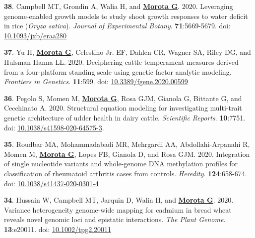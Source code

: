 \documentclass[margin,line,10pt]{res}
\newenvironment{list1}{
  \begin{list}{\ding{113}}{%
      \setlength{\itemsep}{0in}
      \setlength{\parsep}{0in} \setlength{\parskip}{0in}
      \setlength{\topsep}{0in} \setlength{\partopsep}{0in} 
      \setlength{\leftmargin}{0.17in}}}{\end{list}}
\begin{document}
\begin{resume}
\begin{list1}
  \vspace{0.5cm}

\item  [{\bf 38}.]  Campbell MT, Grondin A, Walia H, and \textbf{\underline{Morota G}}. 2020. Leveraging genome-enabled growth models to study shoot growth responses to water deficit in rice ({\it Oryza sativa}). \emph{Journal of Experimental Botany}. \textbf{71}:5669-5679. doi: \textcolor{blue}{\href{https://doi.org/10.1093/jxb/eraa280}{10.1093/jxb/eraa280}}

    \vspace{0.5cm}
    
\item [{\bf 37}.] Yu H, \textbf{\underline{Morota G}}, Celestino Jr. EF, Dahlen CR, Wagner SA, Riley DG, and Hulsman Hanna LL. 2020. Deciphering cattle temperament measures derived from a four-platform standing scale using genetic factor analytic modeling. \emph{Frontiers in Genetics}. \textbf{11}:599. doi: \textcolor{blue}{\href{https://doi.org/10.3389/fgene.2020.00599}{10.3389/fgene.2020.00599}}

  \vspace{0.5cm}

    
\item [{\bf 36}.] Pegolo S, Momen M, \textbf{\underline{Morota G}}, Rosa GJM, Gianola G, Bittante G, and Cecchinato A. 2020. Structural equation modeling for investigating multi-trait genetic architecture of udder health in dairy cattle. \emph{Scientific Reports}. \textbf{10}:7751. doi: \textcolor{blue}{\href{https://doi.org/10.1038/s41598-020-64575-3}{10.1038/s41598-020-64575-3}}. 

  \vspace{0.5cm}

\item  [{\bf 35}.] Roudbar MA, Mohammadabadi MR, Mehrgardi AA, Abdollahi-Arpanahi R,  Momen M, \textbf{\underline{Morota G}}, Lopes FB, Gianola D, and Rosa GJM. 2020. Integration of single nucleotide variants and whole-genome DNA methylation profiles for classification of rheumatoid arthritis cases from controls. \emph{Heredity}. \textbf{124}:658-674. doi: \textcolor{blue}{\href{https://doi.org/10.1038/s41437-020-0301-4}{10.1038/s41437-020-0301-4}} 
  
      \vspace{0.5cm}

  \item  [{\bf 34}.]  Hussain W, Campbell MT, Jarquin D, Walia H, and \textbf{\underline{Morota G}}. 2020. Variance heterogeneity genome-wide mapping for cadmium in bread wheat reveals novel genomic loci and epistatic interactions. \emph{The Plant Genome}. \textbf{13}:e20011. doi: \textcolor{blue}{\href{https://doi.org/10.1002/tpg2.20011}{10.1002/tpg2.20011}}


\end{list1}
\end{resume}
\end{document}
